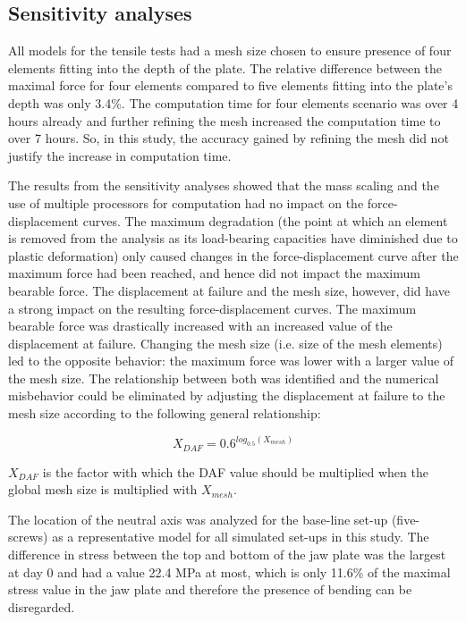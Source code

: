 
\subsection{Sensitivity analyses}

All models for the tensile tests had a mesh size chosen to ensure presence of four elements fitting into the depth of the plate. The relative difference between the maximal force for four elements compared to five elements fitting into the plate’s depth was only 3.4\%. The computation time for four elements scenario was over 4 hours already and further refining the mesh increased the computation time to over 7 hours. So, in this study, the accuracy gained by refining the mesh did not justify the increase in computation time.

The results from the sensitivity analyses showed that the mass scaling and the use of multiple processors for computation had no impact on the force-displacement curves. The maximum degradation (the point at which an element is removed from the analysis as its load-bearing capacities have diminished due to plastic deformation) only caused changes in the force-displacement curve after the maximum force had been reached, and hence did not impact the maximum bearable force. The displacement at failure and the mesh size, however, did have a strong impact on the resulting force-displacement curves. The maximum bearable force was drastically increased with an increased value of the displacement at failure. Changing the mesh size (i.e. size of the mesh elements) led to the opposite behavior: the maximum force was lower with a larger value of the mesh size. The relationship between both was identified and the numerical misbehavior could be eliminated by adjusting the displacement at failure to the mesh size according to the following general relationship:

\begin{equation}
X_{DAF}=0.6^{log_{0.5}(X_{mesh})}
\end{equation}

\noindent $X_{DAF}$ is the factor with which the {DAF} value should be multiplied when the global mesh size is multiplied with $X_{mesh}$.

The location of the neutral axis was analyzed for the base-line set-up (five-screws) as a representative model for all simulated set-ups in this study. The difference in stress between the top and bottom of the jaw plate was the largest at day 0 and had a value 22.4 MPa at most, which is only 11.6\% of the maximal stress value in the jaw plate and therefore the presence of bending can be disregarded.

